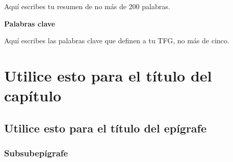 \documentclass[13pt,a4paper]{report}
\begin{document}
Aquí escribes tu resumen de no más de 200 palabras.

\vspace{12pt}

{\fontsize{16}{19.2}\selectfont \textbf{Palabras clave}}

\vspace{12pt}

Aquí escribes las palabras clave que definen a tu TFG, no más de cinco.

\newpage  


\section{Utilice esto para el título del capítulo} 

\subsection*{Utilice esto para el título del epígrafe} 


\subsubsection*{Subsubepígrafe} 
\end{document}

